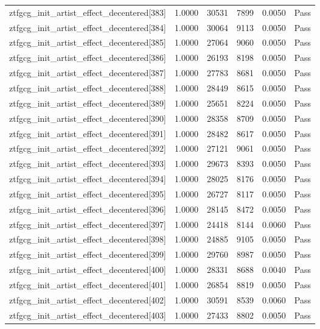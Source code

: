 \begin{table}[htbp]
\begin{tabular}{llrrll}
ztfgcg\_init\_artist\_effect\_decentered[383] & 1.0000 & 30531 & 7899 & 0.0050 & Pass \\
ztfgcg\_init\_artist\_effect\_decentered[384] & 1.0000 & 30064 & 9113 & 0.0050 & Pass \\
ztfgcg\_init\_artist\_effect\_decentered[385] & 1.0000 & 27064 & 9060 & 0.0050 & Pass \\
ztfgcg\_init\_artist\_effect\_decentered[386] & 1.0000 & 26193 & 8198 & 0.0050 & Pass \\
ztfgcg\_init\_artist\_effect\_decentered[387] & 1.0000 & 27783 & 8681 & 0.0050 & Pass \\
ztfgcg\_init\_artist\_effect\_decentered[388] & 1.0000 & 28449 & 8615 & 0.0050 & Pass \\
ztfgcg\_init\_artist\_effect\_decentered[389] & 1.0000 & 25651 & 8224 & 0.0050 & Pass \\
ztfgcg\_init\_artist\_effect\_decentered[390] & 1.0000 & 28358 & 8709 & 0.0050 & Pass \\
ztfgcg\_init\_artist\_effect\_decentered[391] & 1.0000 & 28482 & 8617 & 0.0050 & Pass \\
ztfgcg\_init\_artist\_effect\_decentered[392] & 1.0000 & 27121 & 9061 & 0.0050 & Pass \\
ztfgcg\_init\_artist\_effect\_decentered[393] & 1.0000 & 29673 & 8393 & 0.0050 & Pass \\
ztfgcg\_init\_artist\_effect\_decentered[394] & 1.0000 & 28025 & 8176 & 0.0050 & Pass \\
ztfgcg\_init\_artist\_effect\_decentered[395] & 1.0000 & 26727 & 8117 & 0.0050 & Pass \\
ztfgcg\_init\_artist\_effect\_decentered[396] & 1.0000 & 28145 & 8472 & 0.0050 & Pass \\
ztfgcg\_init\_artist\_effect\_decentered[397] & 1.0000 & 24418 & 8144 & 0.0060 & Pass \\
ztfgcg\_init\_artist\_effect\_decentered[398] & 1.0000 & 24885 & 9105 & 0.0050 & Pass \\
ztfgcg\_init\_artist\_effect\_decentered[399] & 1.0000 & 29760 & 8987 & 0.0050 & Pass \\
ztfgcg\_init\_artist\_effect\_decentered[400] & 1.0000 & 28331 & 8688 & 0.0040 & Pass \\
ztfgcg\_init\_artist\_effect\_decentered[401] & 1.0000 & 26854 & 8819 & 0.0050 & Pass \\
ztfgcg\_init\_artist\_effect\_decentered[402] & 1.0000 & 30591 & 8539 & 0.0060 & Pass \\
ztfgcg\_init\_artist\_effect\_decentered[403] & 1.0000 & 27433 & 8802 & 0.0050 & Pass \\

\end{tabular}
\end{table}
